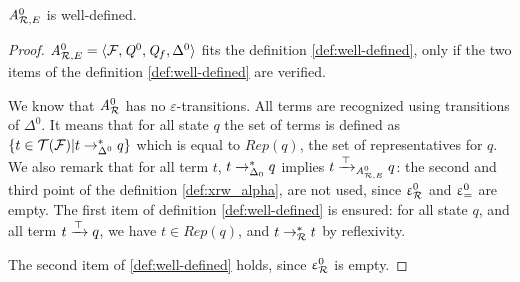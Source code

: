 

\setcounter{savetheorem}{\thetheorem}

\begin{property}
  ${\it A}_{\mathcal R,E}^0$ is well-defined.
\end{property}

\begin{proof}
   ${\it A}_{\mathcal R,E}^0 = \langle \mathcal{F}, \mathit Q^0, \mathit Q_f, \Delta^0\rangle$ fits the definition \ref{def:well-defined}, only if the two items
   of the definition \ref{def:well-defined} are verified.

   We know that ${\it A}_{\mathcal R}^0$ has no $\varepsilon$-transitions. All
   terms are recognized using transitions of $\Delta^0$. It means that for all state $q$
   the set of terms is defined as $\{ t \in \mathcal{T(F)} | t \rightarrow^*_{\Delta^0} q\}$ which is
   equal to $Rep(q)$, the set of representatives for $q$.
   We also remark that for all term $t$, $t \rightarrow^*_{\Delta_0} q$ implies $t \xrightarrow{\top}_{{\it A}_{\mathcal R,E}^0} q$:
   the second and third point of the definition \ref{def:xrw_alpha}, are not used, since $\upvarepsilon_{\mathcal R}^0$ and $\upvarepsilon_{=}^0$ are empty.
   The first item of definition \ref{def:well-defined} is ensured: for all state $q$, and all term $t \xrightarrow{\top} q$,
   we have $t \in Rep(q)$, and $t \rightarrow_\mathcal R^* t$ by reflexivity.

   The second item of \ref{def:well-defined} holds, since $\upvarepsilon_{\mathcal R}^0$ is empty. 
\end{proof}




